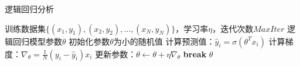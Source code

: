\documentclass{article}
\begin{document}
	
	\begin{algorithm}
		\caption{逻辑回归分析}
		\begin{algorithmic}[1]
			\Require 训练数据集$\{(x_1, y_1), (x_2, y_2), \ldots, (x_N, y_N)\}$，学习率$\eta$，迭代次数$MaxIter$
			\Ensure 逻辑回归模型参数$\theta$
			\State 初始化参数$\theta$为小的随机值
			\State 计算预测值：$\hat{y}_i = \sigma(\theta^T x_i)$
			\State 计算梯度：$\nabla_{\theta} = \frac{1}{N} (y_i - \hat{y}_i) x_i$
			\State 更新参数：$\theta \leftarrow \theta + \eta \nabla_{\theta}$
			\EndFor
			 \State \textbf{break} \EndIf
			\EndFor
			\State \Return $\theta$
		\end{algorithmic}
	\end{algorithm}
	
\end{document}
